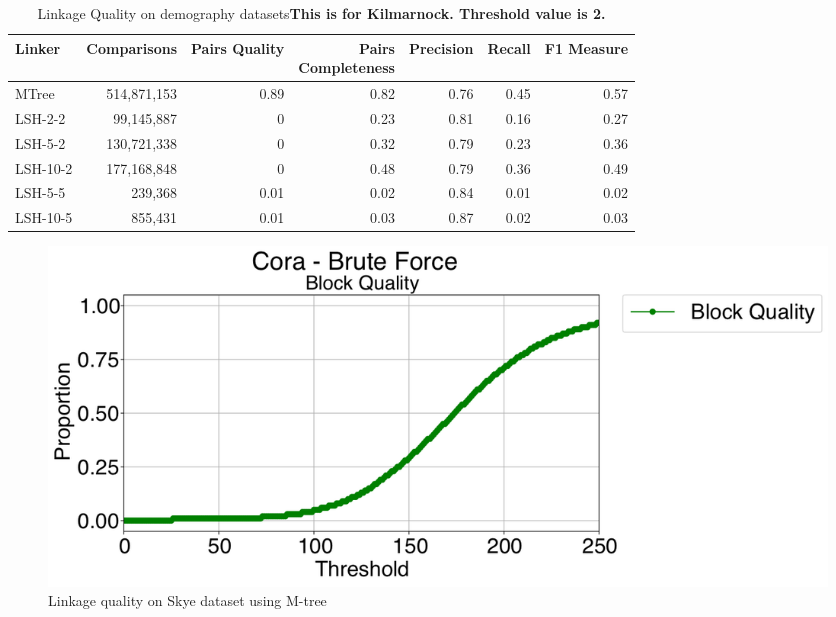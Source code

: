 \documentclass{llncs}
\begin{document}
\begin{table}[ht]
\centering
\begin{tabular}{l|r|r|r|r|r|r}
\parbox{0.18\linewidth}{\centering Linker} &
\parbox{0.16\linewidth}{\centering Comparisons} &
\parbox{0.11\linewidth}{\centering Pairs Quality} &
\parbox{0.17\linewidth}{\centering Pairs \\ Completeness} &
\parbox{0.11\linewidth}{\centering Precision} &
\parbox{0.08\linewidth}{\centering Recall} &
\parbox{0.11\linewidth}{\centering F1 Measure} \\ \hline \hline
MTree     & 514,871,153         & 0.89                  & 0.82                       & 0.76      & 0.45   & 0.57      \\ \hline
LSH-2-2   & 99,145,887          & 0                     & 0.23                       & 0.81      & 0.16   & 0.27       \\
LSH-5-2   & 130,721,338         & 0                     & 0.32                       & 0.79      & 0.23   & 0.36       \\
LSH-10-2  & 177,168,848         & 0                     & 0.48                       & 0.79      & 0.36   & 0.49       \\
LSH-5-5   & 239,368            & 0.01                  & 0.02                       & 0.84      & 0.01   & 0.02       \\
LSH-10-5  & 855,431            & 0.01                  & 0.03                       & 0.87      & 0.02   & 0.03 \\ \hline
\end{tabular}
\caption{Linkage Quality on demography datasets\textbf{This is for Kilmarnock. Threshold value is 2.}
\label{comparison-of-results-demography-kili}
}
\end{table}

\begin{figure}
\includegraphics[width=\textwidth]{figures/plotBQ_--_Cora_-_Brute_Force}
\caption{Linkage quality on Skye dataset using M-tree\label{skye-quality-mtree}}
\end{figure}
\end{document}

